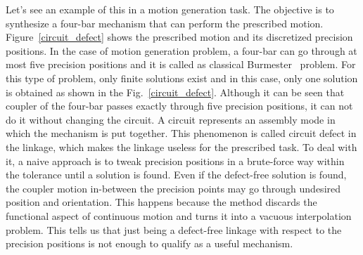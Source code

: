 \documentclass[twocolumn,10pt]{asme2ej}
\begin{document}
Let's see an example of this in a motion generation task.
The objective is to synthesize a four-bar mechanism that can perform the prescribed motion.
Figure~\ref{circuit_defect} shows the prescribed motion and its discretized precision positions.
In the case of motion generation problem, a four-bar can go through at most five precision positions and it is called as classical Burmester~\cite{Burmester86} problem.
For this type of problem, only finite solutions exist and in this case, only one solution is obtained as shown in the Fig.~\ref{circuit_defect}.
Although it can be seen that coupler of the four-bar passes exactly through five precision positions, it can not do it without changing the circuit.
A circuit represents an assembly mode in which the mechanism is put together.
This phenomenon is called circuit defect in the linkage, which makes the linkage useless for the prescribed task.
To deal with it, a naive approach is to tweak precision positions in a brute-force way within the tolerance until a solution is found.
Even if the defect-free solution is found, the coupler motion in-between the precision points may go through undesired position and orientation.
This happens because the method discards the functional aspect of continuous motion and turns it into a vacuous interpolation problem.
This tells us that just being a defect-free linkage with respect to the precision positions is not enough to qualify as a useful mechanism.
\end{document}
